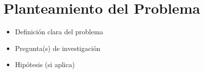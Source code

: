 \chapter{Planteamiento del Problema} 
\begin{itemize}
    \item Definición clara del problema
    \item Pregunta(s) de investigación
    \item Hipótesis (si aplica)

\end{itemize}